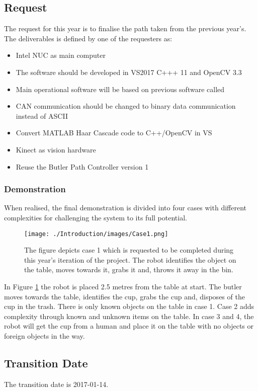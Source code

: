 \subsection{Request}
The request for this year is to finalise the path taken from the previous year's. The deliverables is defined by one of the requesters as:

\begin{itemize}
    \item Intel NUC as main computer
    \item The software should be developed in VS2017 C+++ 11 and OpenCV 3.3
    \item Main operational software will be based on previous software called 
    \item CAN communication should be changed to binary data communication instead of ASCII
    \item Convert MATLAB Haar Cascade code to C++/OpenCV in VS
    \item Kinect as vision hardware
    \item Reuse the Butler Path Controller version 1
\end{itemize}

\subsubsection{Demonstration}
When realised, the final demonstration is divided into four cases with different complexities for challenging the system to its full potential.


\begin{figure}[ht]
    \centering
    \texttt{[image: ./Introduction/images/Case1.png]}
    \caption{The figure depicts case 1 which is requested to be completed during this year's iteration of the project. The robot identifies the object on the table, moves towards it, grabs it and, throws it away in the bin.}
    \label{fig:case1}
\end{figure}

In Figure \ref{fig:case1} the robot is placed 2.5 metres from the table at start. The butler moves towards the table, identifies the cup, grabs the cup and, disposes of the cup in the trash. There is only known objects on the table in case 1. Case 2 adds complexity through known and unknown items on the table. In case 3 and 4, the robot will get the cup from a human and place it on the table with no objects or foreign objects in the way.

\subsection{Transition Date}
The transition date is 2017-01-14.

